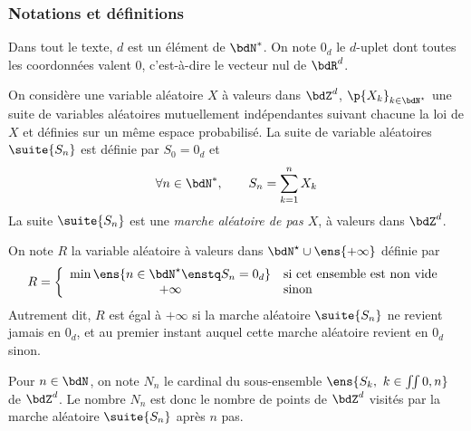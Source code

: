 \documentclass[a4paper,french,bookmarks]{article}
\begin{document}
    \renewcommand{\thesection}{\Roman{section}}
    \renewcommand{\thesubsection}{\Roman{section}.\Alph{subsection}}
    \renewcommand{\labelenumi}{\thesection.\arabic{enumi}.}
    \renewcommand*{\labelenumii}{\alph{enumii})}

    
    \subsubsection*{Notations et définitions}
    
    \begin{enumerate}
        \itt Dans tout le texte, $d$ est un élément de $\bdN^*$. On note $0_d$ le $d$-uplet dont toutes les coordonnées valent $0$, c'est-à-dire le vecteur nul de $\bdR^d$.
        
        \itt On considère une variable aléatoire $X$ à valeurs dans $\bdZ^d$, $\p{X_k}_{k \in \bdN^\star}$ une suite de variables aléatoires mutuellement indépendantes suivant chacune la loi de $X$ et définies sur un même espace probabilisé. La suite de variable aléatoires $\suite{S_n}$ est définie par $S_0 = 0_d$ et
        \[ \forall n \in \bdN^*,\qquad S_n = \sum_{k=1}^n X_k\]
        La suite $\suite{S_n}$ est une \emph{marche aléatoire de pas $X$}, à valeurs dans $\bdZ^d$.
        
        \itt On note $R$ la variable aléatoire à valeurs dans $\bdN^\star \cup \ens{+\infty}$ définie par
        \[ R = \left\lbrace\begin{array}{cl}
            \min\ens{n \in \bdN^\star \enstq S_n = 0_d} &\text{si cet ensemble est non vide}  \\
            +\infty &\text{sinon} 
        \end{array}\right.\]
        Autrement dit, $R$ est égal à $+\infty$ si la marche aléatoire $\suite{S_n}$ ne revient jamais en $0_d$, et au premier instant auquel cette marche aléatoire revient en $0_d$ sinon.
        
        \itt Pour $n \in \bdN$, on note $N_n$ le cardinal du sous-ensemble $\ens{S_k,\ k \in \iint{0, n}}$ de $\bdZ^d$. Le nombre $N_n$ est donc le nombre de points de $\bdZ^d$ visités par la marche aléatoire $\suite{S_n}$ après $n$ pas.
    \end{enumerate}
    
\end{document}
